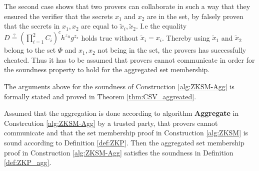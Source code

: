 The second case shows that two provers can collaborate in such a way that they ensured the verifier that the secrets $x_1$ and $x_2$ are in the set, by falsely proven that the secrets in $x_1,x_2$ are equal to $\tilde{x}_i,\tilde{x}_2$. I.e the equality $D\overset{?}{=} ( \prod_{i=1}^2 C_i)^ch^{z_R}g^{z_x}$ holds true without $\tilde{x}_i=x_i$. Thereby using $\tilde{x}_1$ and $\tilde{x}_2$ belong to the set $\Phi$ and $x_1,x_2$ not being in the set, the provers has successfully cheated.
Thus it has to be assumed that provers cannot communicate in order for the soundness property to hold for the aggregated set membership. 

The arguments above for the soundness of Construction \ref{alg:ZKSM-Agg} is formally stated and proved in Theorem \ref{thm:CSV_aggreated}. 

\hspace{10pt}
\begin{thm}
\label{thm:CSV_aggreated}
Assumed that  the aggregation is done according to algorithm \textbf{Aggregate} in Constrcution \ref{alg:ZKSM-Agg} by a trusted party,  that provers cannot communicate and that the set membership proof in Construction \ref{alg:ZKSM} is sound according to Definition \ref{def:ZKP}. Then the aggregated set membership proof in Construction \ref{alg:ZKSM-Agg} satisfies the soundness in Definition \ref{def:ZKP_agg}. 
\end{thm}

